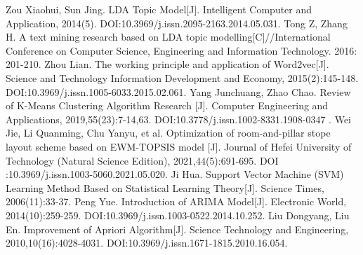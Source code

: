 \documentclass[12pt]{article}
\begin{document}
	
    \newpage
    \addtocounter{section}{1}
	\begin{thebibliography}{99}
		 Zou Xiaohui, Sun Jing. LDA Topic Model[J]. Intelligent Computer and Application, 2014(5). DOI:10.3969/j.issn.2095-2163.2014.05.031.
		 Tong Z, Zhang H. A text mining research based on LDA topic modelling[C]//International Conference on Computer Science, Engineering and Information Technology. 2016: 201-210.
		  Zhou Lian. The working principle and application of Word2vec[J]. Science and Technology Information Development and Economy, 2015(2):145-148. DOI:10.3969/j.issn.1005-6033.2015.02.061.
         Yang Junchuang, Zhao Chao. Review of K-Means Clustering Algorithm Research [J]. Computer Engineering and Applications, 2019,55(23):7-14,63. DOI:10.3778/j.issn.1002-8331.1908-0347 .
         Wei Jie, Li Quanming, Chu Yanyu, et al. Optimization of room-and-pillar stope layout scheme based on EWM-TOPSIS model [J]. Journal of Hefei University of Technology (Natural Science Edition), 2021,44(5):691-695. DOI :10.3969/j.issn.1003-5060.2021.05.020.
         Ji Hua. Support Vector Machine (SVM) Learning Method Based on Statistical Learning Theory[J]. Science Times, 2006(11):33-37.
         Peng Yue. Introduction of ARIMA Model[J]. Electronic World, 2014(10):259-259. DOI:10.3969/j.issn.1003-0522.2014.10.252.
         Liu Dongyang, Liu En. Improvement of Apriori Algorithm[J]. Science Technology and Engineering, 2010,10(16):4028-4031. DOI:10.3969/j.issn.1671-1815.2010.16.054.
	\end{thebibliography}
	\newpage
\end{document}
